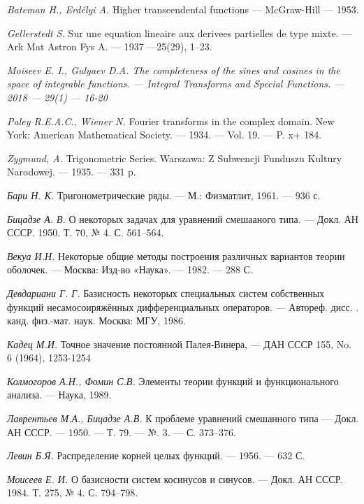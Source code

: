 ﻿\documentclass[oneside, final, 14pt]{extreport}
\begin{document}
\begin{thebibliography}{30}

	{\it Bateman H., Erd{\'e}lyi A.} Higher transcendental functions — 
	McGraw-Hill — 1953.
	
	{\it Gellerstedt S.} Sur une equation lineaire aux derivees partielles de type mixte. — 
	Ark Mat Astron Fys A. — 1937 —25(29), 1–23. 
	
	\it{Moiseev E. I., Gulyaev D.A.}
	The completeness of the sines and cosines in the space of integrable functions. —
	Integral Transforms and Special Functions. — 2018 — 29(1) — 16-20

	{\it Paley R.E.A.C., Wiener N.} Fourier transforms in the complex domain. 
	New York: American Mathematical Society. — 1934. — Vol. 19. — P. x+ 184.
	
	{\it Zygmund, A.} Trigonometric Series. 
		Warszawa: Z Subwencji Funduszu Kultury Narodowej. — 1935. — 331 p.
	
	{\it Бари Н. К.} Тригонометрические ряды. —
	М.: Физматлит, 1961. — 936 с.
	
	{\it Бицадзе А. В. } О некоторых задачах для уравнений смешааного типа. —
	Докл. АН СССР. 1950. Т. 70, № 4. С. 561–564.
	
	{\it Векуа И.Н.} Некоторые общие методы построения различных вариантов теории оболочек. — 
	Москва: Изд-во «Наука». — 1982. — 288 С.
	
	{\it Девдариани Г. Г.} Базисность некоторых специальных систем собственных функций несамосоиряжённых дифференциальных операторов. —
	Автореф. дисс. . канд. физ.-мат. наук. Москва: МГУ, 1986.
	
	{\it Кадец М.И.} Точное значение постоянной Палея-Винера, —
	ДАН СССР 155, No. 6 (1964), 1253-1254
	
	{\it Колмогоров А.Н., Фомин С.В.} Элементы теории функций и функционального анализа. —
	Наука, 1989.
	
	{\it Лаврентьев М.А., Бицадзе А.В.} К проблеме уравнений смешанного типа — 
	Докл. АН СССР. — 1950. — Т. 79. — №. 3. — С. 373–376.

	{\it Левин Б.Я.} Распределение корней целых функций. — 1956. — 632 С.
	
	{\it Моисеев Е. И.} О базисности систем косинусов и синусов. —
	Докл. АН СССР. 1984. Т. 275, № 4. С. 794–798.
	

\end{thebibliography}
\end{document}
